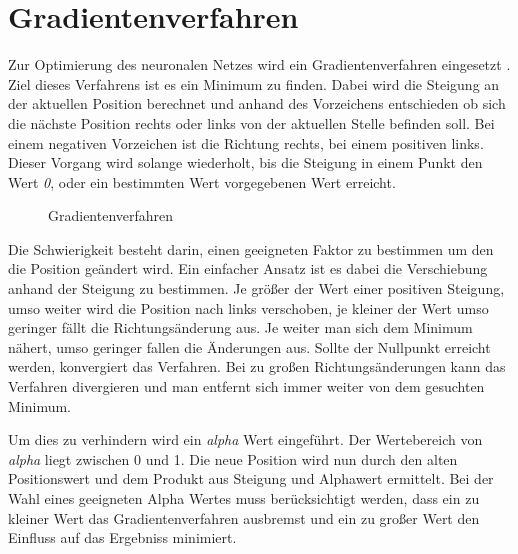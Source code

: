 \chapter{Gradientenverfahren}
Zur Optimierung des neuronalen Netzes wird ein Gradientenverfahren eingesetzt . Ziel dieses Verfahrens ist es ein Minimum zu finden. Dabei wird die Steigung an der aktuellen Position berechnet und anhand des Vorzeichens entschieden ob sich die nächste Position rechts oder links von der aktuellen Stelle befinden soll. Bei einem negativen Vorzeichen ist die Richtung rechts, bei einem positiven links. Dieser Vorgang wird solange wiederholt, bis die Steigung in einem Punkt den Wert \emph{0}, oder ein bestimmten Wert vorgegebenen Wert erreicht.

\begin{figure}[h!]
	\begin{center}
	\caption{Gradientenverfahren}
	\label{gradient}
	\end{center}
\end{figure}

Die Schwierigkeit besteht darin, einen geeigneten Faktor zu bestimmen um den die Position geändert wird. Ein einfacher Ansatz ist es dabei die Verschiebung anhand der Steigung zu bestimmen. Je größer der Wert einer positiven Steigung, umso weiter wird die Position nach links verschoben, je kleiner der Wert umso geringer fällt die Richtungsänderung aus. Je weiter man sich dem Minimum nähert, umso geringer fallen die Änderungen aus. Sollte der Nullpunkt erreicht werden, konvergiert das Verfahren. Bei zu großen Richtungsänderungen kann das Verfahren divergieren und man entfernt sich immer weiter von dem gesuchten Minimum.

Um dies zu verhindern wird ein \emph{alpha} Wert eingeführt. Der Wertebereich von \emph{alpha} liegt zwischen 0 und 1. Die neue Position wird nun durch den alten Positionswert und dem Produkt aus Steigung und Alphawert ermittelt. Bei der Wahl eines geeigneten Alpha Wertes muss berücksichtigt werden, dass ein zu kleiner Wert das Gradientenverfahren ausbremst und ein zu großer Wert den Einfluss auf das Ergebniss minimiert.

